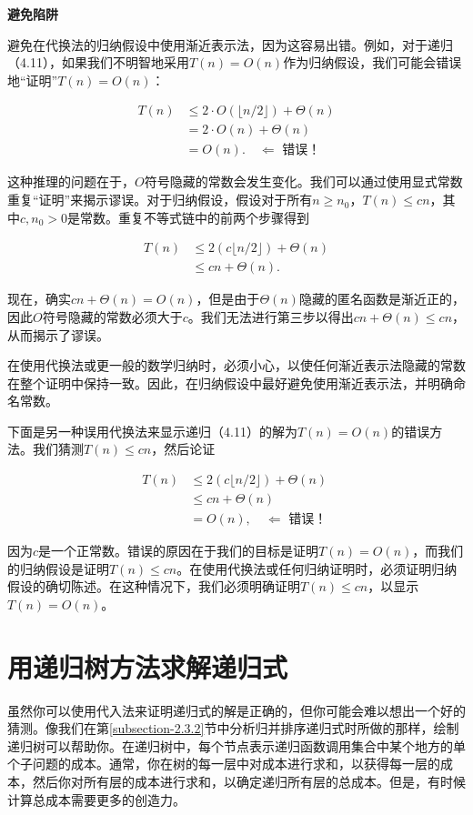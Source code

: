 \documentclass[lang=cn,newtx,10pt,scheme=chinese]{elegantbook}
\begin{document}
\textbf{避免陷阱}

避免在代换法的归纳假设中使用渐近表示法，因为这容易出错。例如，对于递归（4.11），如果我们不明智地采用$T(n)=O(n)$作为归纳假设，我们可能会错误地“证明”$T(n)=O(n)$：

$$
\begin{aligned}
T(n) & \leq 2 \cdot O(\lfloor n / 2\rfloor)+\Theta(n) \\
& =2 \cdot O(n)+\Theta(n) \\
& =O(n) . \quad \Longleftarrow \text { 错误！ }
\end{aligned}
$$

这种推理的问题在于，$O$符号隐藏的常数会发生变化。我们可以通过使用显式常数重复“证明”来揭示谬误。对于归纳假设，假设对于所有$n \geq n_0$，$T(n) \leq c n$，其中$c, n_0>0$是常数。重复不等式链中的前两个步骤得到

$$
\begin{aligned}
T(n) & \leq 2(c\lfloor n / 2\rfloor)+\Theta(n) \\
& \leq c n+\Theta(n) .
\end{aligned}
$$

现在，确实$c n+\Theta(n)=O(n)$，但是由于$\Theta(n)$隐藏的匿名函数是渐近正的，因此$O$符号隐藏的常数必须大于$c$。我们无法进行第三步以得出$c n+\Theta(n) \leq c n$，从而揭示了谬误。

在使用代换法或更一般的数学归纳时，必须小心，以使任何渐近表示法隐藏的常数在整个证明中保持一致。因此，在归纳假设中最好避免使用渐近表示法，并明确命名常数。

下面是另一种误用代换法来显示递归（4.11）的解为$T(n)=O(n)$的错误方法。我们猜测$T(n) \leq c n$，然后论证

$$
\begin{aligned}
T(n) & \leq 2(c\lfloor n / 2\rfloor)+\Theta(n) \\
& \leq c n+\Theta(n) \\
& =O(n), \quad \Longleftarrow \text { 错误！ }
\end{aligned}
$$

因为$c$是一个正常数。错误的原因在于我们的目标是证明$T(n)=O(n)$，而我们的归纳假设是证明$T(n) \leq c n$。在使用代换法或任何归纳证明时，必须证明归纳假设的确切陈述。在这种情况下，我们必须明确证明$T(n) \leq c n$，以显示$T(n)=O(n)$。

\section{用递归树方法求解递归式}\label{section-4.4}

虽然你可以使用代入法来证明递归式的解是正确的，但你可能会难以想出一个好的猜测。像我们在第\ref{subsection-2.3.2}节中分析归并排序递归式时所做的那样，绘制递归树可以帮助你。在递归树中，每个节点表示递归函数调用集合中某个地方的单个子问题的成本。通常，你在树的每一层中对成本进行求和，以获得每一层的成本，然后你对所有层的成本进行求和，以确定递归所有层的总成本。但是，有时候计算总成本需要更多的创造力。
\end{document}
